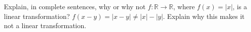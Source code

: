 {Explain, in complete sentences, why or why not $f:\mathbb{R}\to\mathbb{R}$, where $f(x) = |x|$, is a linear transformation?
}
{$f(x-y) = |x-y| \neq |x|-|y|$.  Explain why this makes it not a linear transformation.
}